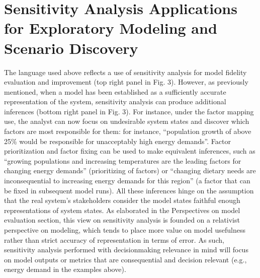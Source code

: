 \documentclass[letterpaper,10pt,english]{sphinxmanual}
\begin{document}
\section{Sensitivity Analysis Applications for Exploratory Modeling and Scenario Discovery}
\label{\detokenize{3_sensitivity_analysis_the_basics:sensitivity-analysis-applications-for-exploratory-modeling-and-scenario-discovery}}
\sphinxAtStartPar
The language used above reflects a use of sensitivity analysis for model fidelity evaluation and improvement (top right panel in Fig. 3). However, as previously mentioned, when a model has been established as a sufficiently accurate representation of the system, sensitivity analysis can produce additional inferences (bottom right panel in Fig. 3). For instance, under the factor mapping use, the analyst can now focus on undesirable system states and discover which factors are most responsible for them: for instance, “population growth of above 25\% would be responsible for unacceptably high energy demands”. Factor prioritization and factor fixing can be used to make equivalent inferences, such as “growing populations and increasing temperatures are the leading factors for changing energy demands” (prioritizing of factors) or “changing dietary needs are inconsequential to increasing energy demands for this region” (a factor that can be fixed in subsequent model runs). All these inferences hinge on the assumption that the real system’s stakeholders consider the model states faithful enough representations of system states. As elaborated in the Perspectives on model evaluation section, this view on sensitivity analysis is founded on a relativist perspective on modeling, which tends to place more value on model usefulness rather than strict accuracy of representation in terms of error. As such, sensitivity analysis performed with decision\sphinxhyphen{}making relevance in mind will focus on model outputs or metrics that are consequential and decision relevant (e.g., energy demand in the examples above).
\end{document}
